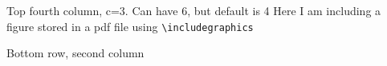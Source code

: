 \documentclass[landscape,final,a0paper,fontscale=0.285]{baposter}
\begin{document}
\begin{poster}
{   Top fourth column, c=3.  Can have 6, but default is 4
   Here I am including a figure stored in a pdf file using \texttt{\textbackslash includegraphics}
    }

%
%
   {
   Bottom row, second column
    }

%
%
     

\end{poster}
\end{document}
